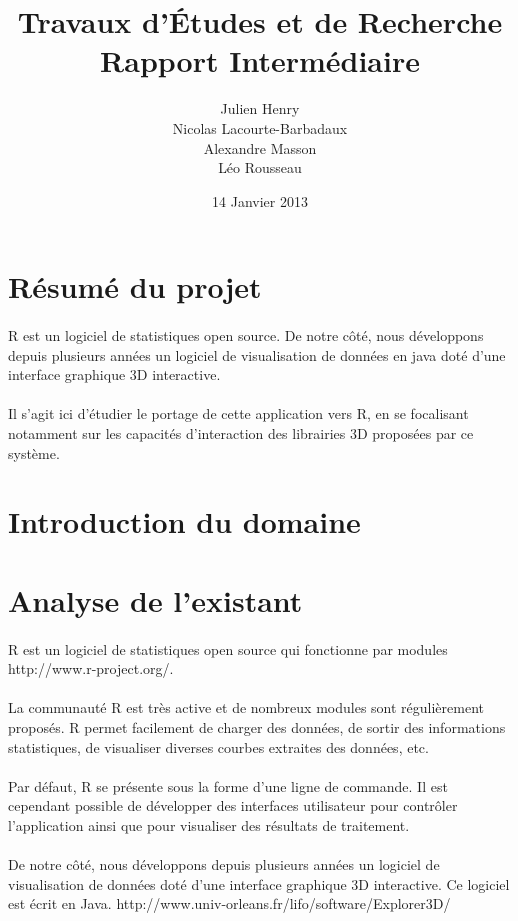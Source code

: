 \documentclass{article}
\title{Travaux d’Études et de Recherche\\Rapport Intermédiaire}
\author{Julien Henry\\Nicolas Lacourte-Barbadaux\\Alexandre Masson\\Léo Rousseau}
\date{14 Janvier 2013}
\begin{document}
\maketitle
\newpage
\tableofcontents
\newpage
\section{Résumé du projet}
\paragraph{} R est un logiciel de statistiques open source. De notre côté, nous développons depuis plusieurs années un logiciel de visualisation de données en java doté d'une interface graphique 3D interactive.
\paragraph{}
Il s'agit ici d'étudier le portage de cette application vers R, en se focalisant notamment sur les capacités d'interaction des librairies 3D proposées par ce système.
\newpage
\section{Introduction du domaine}
\newpage
\section{Analyse de l'existant}
\paragraph{}
R est un logiciel de statistiques open source qui fonctionne par modules
http://www.r-project.org/.
\paragraph{}
La communauté R est très active et de nombreux modules sont régulièrement proposés.
R permet facilement de charger des données, de sortir des informations statistiques, de visualiser
diverses courbes extraites des données, etc.
\paragraph{}
Par défaut, R se présente sous la forme d'une ligne de commande. Il est cependant possible de
développer des interfaces utilisateur pour contrôler l'application ainsi que pour visualiser des
résultats de traitement.
\paragraph{}
De notre côté, nous développons depuis plusieurs années un logiciel de visualisation de données
doté d'une interface graphique 3D interactive. Ce logiciel est écrit en Java.
http://www.univ-orleans.fr/lifo/software/Explorer3D/
\end{document}
